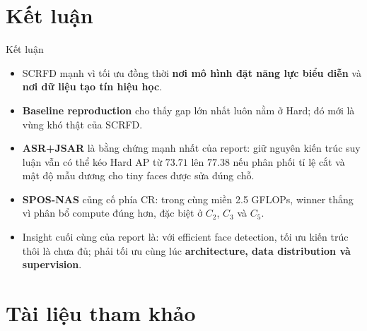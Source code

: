 \documentclass[aspectratio=169,11pt]{beamer}
\begin{document}
\section{Kết luận}

\begin{frame}{Kết luận}
  \begin{itemize}
    \item SCRFD mạnh vì tối ưu đồng thời \textbf{nơi mô hình đặt năng lực biểu diễn} và \textbf{nơi dữ liệu tạo tín hiệu học}.
    \item \textbf{Baseline reproduction} cho thấy gap lớn nhất luôn nằm ở Hard; đó mới là vùng khó thật của SCRFD.
    \item \textbf{ASR+JSAR} là bằng chứng mạnh nhất của report: giữ nguyên kiến trúc suy luận vẫn có thể kéo Hard AP từ \(73.71\) lên \(77.38\) nếu phân phối tỉ lệ cắt và mật độ mẫu dương cho tiny faces được sửa đúng chỗ.
    \item \textbf{SPOS-NAS} củng cố phía CR: trong cùng miền 2.5 GFLOPs, winner thắng vì phân bổ compute đúng hơn, đặc biệt ở \(C_2\), \(C_3\) và \(C_5\).
    \item Insight cuối cùng của report là: với efficient face detection, tối ưu kiến trúc thôi là chưa đủ; phải tối ưu cùng lúc \textbf{architecture, data distribution và supervision}.
  \end{itemize}
\end{frame}

\section{Tài liệu tham khảo}
\end{document}
